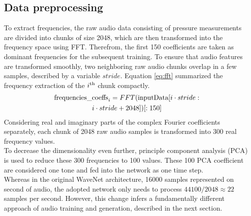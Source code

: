 \documentclass[10pt,conference,compsocconf]{IEEEtran}
\begin{document}
\subsection{Data preprocessing}
To extract frequencies, the raw audio data consisting of pressure measurements are divided into chunks of size 2048, which are then transformed into the frequency space using FFT. Therefrom, the first 150 coefficients are taken as dominant frequencies for the subsequent training. To ensure that audio features are transformed smoothly, two neighboring raw audio chunks overlap in a few samples, described by a variable $stride$. Equation \ref{eq:fft} summarized the frequency extraction of the $i^\textnormal{th}$ chunk compactly.
\begin{multline}\label{eq:fft}
\textnormal{frequencies\_coeffs}_i =
FFT(\textnormal{inputData}[i \cdot stride:\\i \cdot stride+2048])[:150]
\end{multline}
Considering real and imaginary parts of the complex Fourier coefficients separately, each chunk of 2048 raw audio samples is transformed into 300 real frequency values.\\
To decrease the dimensionality even further, principle component analysis (PCA) is used to reduce these 300 frequencies to 100 values. These 100 PCA coefficient are considered one tone and fed into the network as one time step.\\
Whereas in the original WaveNet architecture, 16000 samples represented on second of audio, the adopted network only needs to process $44100/2048 \approx 22$ samples per second. However, this change infers a fundamentally different approach of audio training and generation, described in the next section. \\
\end{document}
